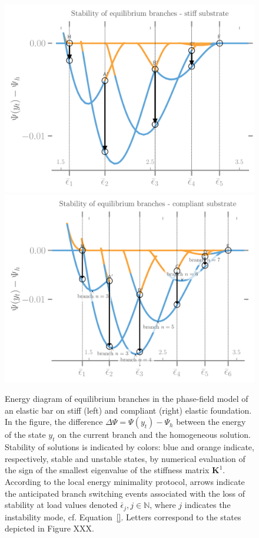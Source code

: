 \begin{figure}[htbp]
    \centering
    \includegraphics*[width=.45\textwidth]{../images/model_stiff_energy.png}
    \includegraphics*[width=.45\textwidth]{../images/model_compliant_energy.png}
    \caption{
        Energy diagram of equilibrium branches in the phase-field model of an elastic bar on stiff (left) and compliant (right) elastic foundation. In the figure, the difference $\Delta \Psi = \Psi(y_t)-\Psi_h$ between the energy of the state $y_t$ on the current branch and the homogeneous solution. Stability of solutions is indicated by colors: blue and orange indicate, respectively, stable and unstable states, by numerical evaluation of the sign of the smallest eigenvalue of the stiffness matrix $\mathbf{K}^1$. According to the local energy minimality protocol, arrows indicate the anticipated branch switching events associated with the loss of stability at load values denoted $\bar \epsilon_j, j \in \mathbb N$, where $j$ indicates the instability mode, cf. Equation~\eqref{}. Letters correspond to the states depicted in Figure XXX.%
    }
    \label{fig:}
\end{figure}

